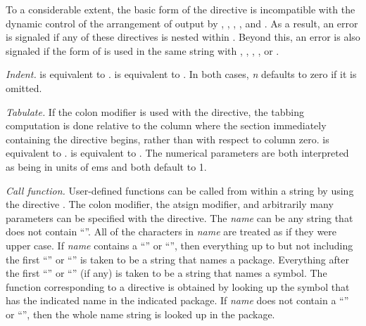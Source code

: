 \begin{flushdesc}
To a considerable extent, the basic form of the directive
 is incompatible with the dynamic control of
the arrangement of output by , \cd{{\Xtilde}\Xunderscore},
, , and .  As
a result, an error is signaled if any of these directives is nested within
.  Beyond this, an error is also signaled if
the  form of
 is used in the same  string with
, \cd{{\Xtilde}\Xunderscore},
, , or .


\item[\cd{{\Xtilde}I}]
{\it Indent.}  is equivalent to
.   is equivalent to
.  In both cases, {\it n} defaults to zero
if it is omitted.


\item[\cd{{\Xtilde}:T}] 
{\it Tabulate.} If the colon modifier is used with the 
directive, the tabbing computation is done relative to the column where the
section immediately containing the directive begins, rather than with
respect to column zero.   is equivalent to
.  
is equivalent to .  The numerical
parameters are both interpreted as being in units of ems and both default
to 1.

\item[\cd{{\Xtilde}/{\it name}/}]
{\it Call function.} User-defined functions can be called from within a
 string by using the directive .  The
colon modifier, the atsign modifier, and arbitrarily many parameters can be
specified with the  directive.  The {\it name}
can be any string that does not contain ``\cdf{/}''.  All of the characters
in {\it name} are treated as if they were upper case.  If {\it name}
contains a ``\cd{:}'' or ``\cd{::}'', then everything up to but not
including the first ``\cd{:}'' or ``\cd{::}'' is taken to be a string that
names a package.  Everything after the first ``\cd{:}'' or ``\cd{::}'' (if
any) is taken to be a string that names a symbol.  The function
corresponding to a  directive is obtained by
looking up the symbol that has the indicated name in the indicated package.
If {\it name} does not contain a ``\cd{:}'' or ``\cd{::}'', then the whole
name string is looked up in the  package.


\end{flushdesc}
